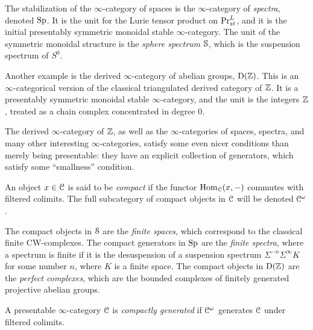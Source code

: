 \begin{example}
    The stabilization of the $\infty$-category of spaces is the $\infty$-category of \emph{spectra}, denoted $\Sp$. It is the unit for the Lurie tensor product on $\PrLs$, and it is the initial presentably symmetric monoidal stable $\infty$-category. The unit of the symmetric monoidal structure is the \emph{sphere spectrum} $\S$, which is the suspension spectrum of $S^0$.  
\end{example}

\begin{example}
    Another example is the derived $\infty$-category of abelian groups, $\Der(\Z)$. This is an $\infty$-categorical version of the classical triangulated derived category of $\Z$. It is a presentably symmetric monoidal stable $\infty$-category, and the unit is the integers $\Z$, treated as a chain complex concentrated in degree $0$. 
\end{example}

The derived $\infty$-category of $\Z$, as well as the $\infty$-categories of spaces, spectra, and many other interesting $\infty$-categories, satisfy some even nicer conditions than merely being presentable: they have an explicit collection of generators, which satisfy some ``smallness'' condition. 

\begin{definition}
    \label{ch0:def:compact-object}
    An object $x\in \C$ is said to be \emph{compact} if the functor $\Hom_\C(x,-)$ commutes with filtered colimits. The full subcategory of compact objects in $\C$ will be denoted $\Co$.
\end{definition}

\begin{example}
    The compact objects in $\Spaces$ are the \emph{finite spaces}, which correspond to the classical finite CW-complexes. The compact generators in $\Sp$ are the \emph{finite spectra}, where a spectrum is finite if it is the desuspension of a suspension spectrum $\Sigma^{-n}\Sigma^\infty K$ for some number $n$, where $K$ is a finite space. The compact objects in $\Der(\Z)$ are the \emph{perfect complexes}, which are the bounded complexes of finitely generated projective abelian groups. 
\end{example}

\begin{definition}
    \label{ch0:def:compactly-generated-category}
    A presentable $\infty$-category $\C$ is \emph{compactly generated} if $\Co$ generates $\C$ under filtered colimits. 
\end{definition}

